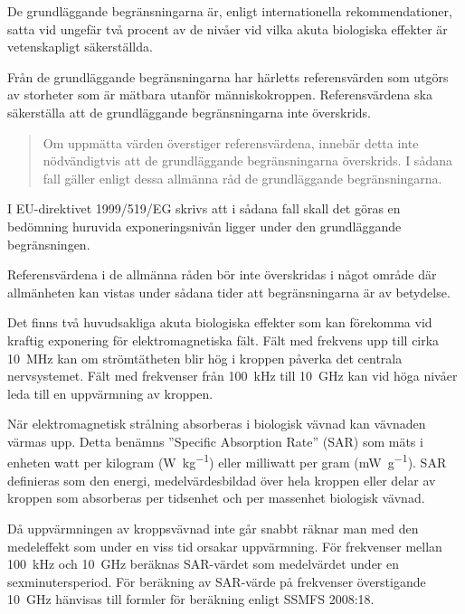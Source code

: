 De grundläggande begränsningarna är, enligt internationella rekommendationer,
satta vid ungefär två procent av de nivåer vid vilka akuta biologiska effekter
är vetenskapligt säkerställda.

Från de grundläggande begränsningarna har härletts referensvärden som utgörs
av storheter som är mätbara utanför människokroppen.
Referensvärdena ska säkerställa att de grundläggande begränsningarna inte
överskrids.

\begin{quote}
	Om uppmätta värden överstiger referensvärdena, innebär detta inte nödvändigtvis
	att de grundläggande begränsningarna överskrids. I sådana fall gäller enligt
	dessa allmänna råd de grundläggande begränsningarna.
\end{quote}

\newpage

I EU-direktivet 1999/519/EG \cite{1999/519/EG} skrivs att i sådana fall skall det
göras en bedömning huruvida exponeringsnivån ligger under den grundläggande
begränsningen.

Referensvärdena i de allmänna råden bör inte överskridas i något område där
allmänheten kan vistas under sådana tider att begränsningarna är av betydelse.

Det finns två huvudsakliga akuta biologiska effekter som kan förekomma vid
kraftig exponering för elektromagnetiska fält.
Fält med frekvens upp till cirka \qty{10}{\mega\hertz} kan om strömtätheten blir
hög i kroppen påverka det centrala nervsystemet.
Fält med frekvenser från \qty{100}{\kilo\hertz} till \qty{10}{\giga\hertz} kan vid
höga nivåer leda till en uppvärmning av kroppen.

När elektromagnetisk strålning absorberas i biologisk vävnad kan vävnaden värmas
upp.
Detta benämns ''Specific Absorption Rate'' (SAR) som mäts i enheten watt per
kilogram (\unit{\watt\per\kilo\gram}) eller milliwatt per gram
(\unit{\milli\watt\per\gram}).
SAR definieras som den energi, medelvärdesbildad över hela kroppen eller delar
av kroppen som absorberas per tidsenhet och per massenhet biologisk vävnad.

Då uppvärmningen av kroppsvävnad inte går snabbt räknar man med den medeleffekt
som under en viss tid orsakar uppvärmning.
För frekvenser mellan \qty{100}{\kilo\hertz} och \qty{10}{\giga\hertz} beräknas
SAR-värdet som medelvärdet under en sexminutersperiod.
För beräkning av SAR-värde på frekvenser överstigande \qty{10}{\giga\hertz}
hänvisas till formler för beräkning enligt SSMFS 2008:18.

